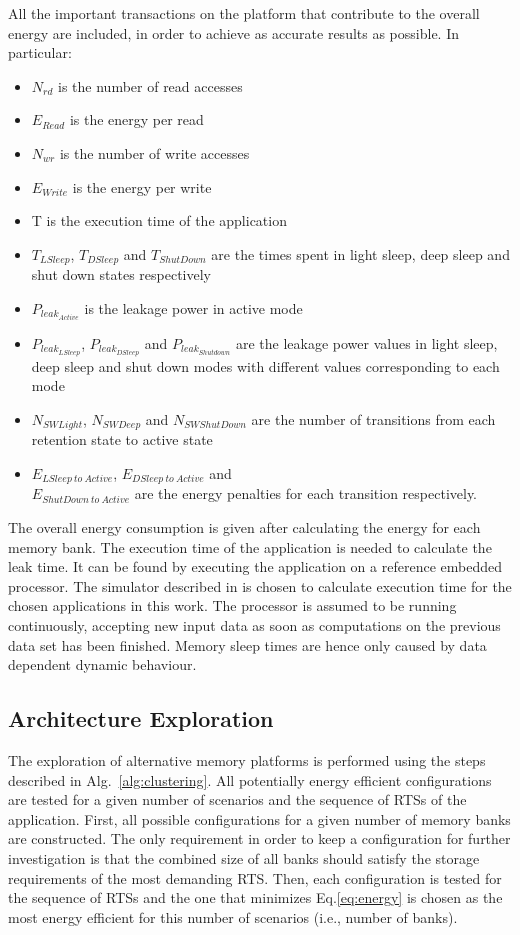 All the important transactions on the platform that contribute to the overall energy are included, in order to achieve as accurate results as possible. In particular:
\begin{itemize}
\item $N_{rd}$ is the number of read accesses
\item $E_{Read}$ is the energy per read
\item $N_{wr}$ is the number of write accesses 
\item $E_{Write}$ is the energy per write 
\item T is the execution time of the application
\item $T_{LSleep}$, $T_{DSleep}$ and $T_{ShutDown}$ are the times spent in light sleep, deep sleep and shut down states respectively
\item $P_{leak_{Active}}$ is the leakage power in active mode 
\item $P_{leak_{LSleep}}$, $P_{leak_{DSleep}}$ and $P_{leak_{Shutdown}}$ are the leakage power values in light sleep, deep sleep and shut down modes with different values corresponding to each mode 
\item $N_{SWLight}$, $N_{SWDeep}$ and $N_{SWShutDown}$ are the number of transitions from each retention state to active state
\item $E_{LSleep \: to \: Active}$, $E_{DSleep \: to \: Active}$ and \\ $E_{ShutDown \: to \: Active}$  are the energy penalties for each transition respectively.
\end{itemize}

 The overall energy consumption is given after calculating the energy for each memory bank. The execution time of the application is needed to calculate the leak time. It can be found by executing the application on a reference embedded processor. The simulator described in \cite{Gem5} is chosen to calculate execution time for the chosen applications in this work. The processor is assumed to be running continuously, accepting new input data as soon as computations on the previous data set has been finished. Memory sleep times are hence only caused by data dependent dynamic behaviour.

\subsection{Architecture Exploration}

The exploration of alternative memory platforms is performed using the steps described in Alg.~\ref{alg:clustering}. All potentially energy efficient configurations are tested for a given number of scenarios and the sequence of RTSs of the application. First, all possible configurations for a given number of memory banks are constructed. The only requirement in order to keep a configuration for further investigation is that the combined size of all banks should satisfy the storage requirements of the most demanding RTS. Then, each configuration is tested for the sequence of RTSs and the one that minimizes Eq.\ref{eq:energy} is chosen as the most energy efficient for this number of scenarios (i.e., number of banks). 

